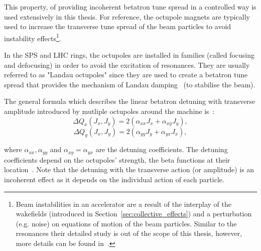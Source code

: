 

This property, of providing incoherent betatron tune spread in a controlled way is used extensively in this thesis. %
For reference, the octupole magnets are typically used to increase the transverse tune spread of the beam particles to avoid %
instability effects\footnote{Beam instabilities in an accelerator are a result of the interplay of the wakefields (introduced in Section~\ref{sec:collective_effects}) and a perturbation (e.g. noise) on equations of motion of the beam particles. Similar to the resonances their detailed study is out of the scope of this thesis, however, more details can be found in~\cite{Rumolo:1982422}.}. 


In the SPS and LHC rings, the octupoles are installed in families (called focusing and defocusing) in order to avoid the excitation of resonances. They are usually referred to as "Landau octupoles" since they are used to create a betatron tune spread that provides the mechanism of Landau damping~\cite{Herr:1982428} (to stabilise the beam).

The general formula which describes the linear betatron detuning with transverse amplitude introduced by mutliple octupoles around the machine is~\cite{Gareyte:321824}:
\begin{equation}\label{eq:DQ_with_amplitude_horizontal}
    \Delta Q_x (J_x, J_y) = 2(\alpha_{xx} J_x + \alpha_{xy}J_y),
\end{equation}
\begin{equation}\label{eq:DQ_with_amplitude_vertical}
    \Delta Q_y (J_x, J_y) = 2(\alpha_{yy} J_y + \alpha_{yx}J_x),
\end{equation}

where $\alpha_{xx}, \alpha_{yy}$ and $\alpha_{xy}=\alpha_{yx}$ are the detuning coefficients. The detuning coefficients depend on the octupoles' strength, the beta functions at their location~\cite{Gareyte:321824}. Note that the detuning with the transverse action (or amplitude) is an incoherent effect as it depends on the individual action of each particle.



